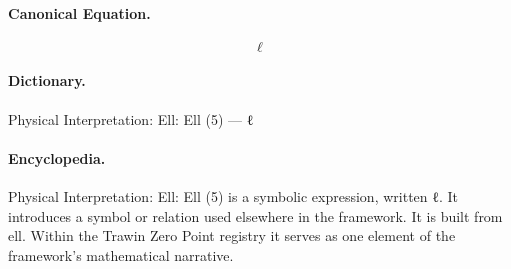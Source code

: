 \paragraph{Canonical Equation.}
\[
\ell
\]

\paragraph{Dictionary.}
Physical Interpretation: Ell: Ell (5) — ℓ

\paragraph{Encyclopedia.}
Physical Interpretation: Ell: Ell (5) is a symbolic expression, written ℓ. It introduces a symbol or relation used elsewhere in the framework. It is built from ell. Within the Trawin Zero Point registry it serves as one element of the framework's mathematical narrative.
